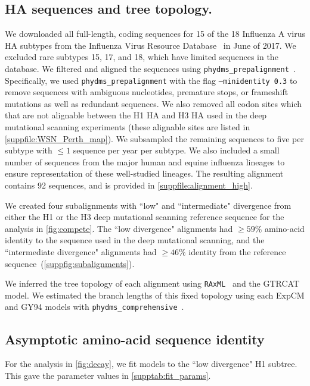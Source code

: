 \documentclass[11pt]{article}
\begin{document}
\subsection*{HA sequences and tree topology.}

We downloaded all full-length, coding sequences for 15 of the 18 Influenza A virus HA subtypes from the Influenza Virus Resource Database~\citep{bao2008influenza} in June of 2017. 
We excluded rare subtypes 15, 17, and 18, which have limited sequences in the database.  
We filtered and aligned the sequences using \texttt{phydms\_prepalignment}~\citep{hilton2017phydms}. 
Specifically, we used \texttt{phydms\_prepalignment} with the flag \texttt{--minidentity 0.3} to remove sequences with ambiguous nucleotides, premature stops, or frameshift mutations as well as redundant sequences.  
We also removed all codon sites which that are not alignable between the H1 HA and H3 HA used in the deep mutational scanning experiments (these alignable sites are listed in  \ref{suppfile:WSN_Perth_map}). 
We subsampled the remaining sequences to five per subtype with $\le 1$ sequence per year per subtype. 
We also included a small number of sequences from the major human and equine influenza lineages to ensure representation of these well-studied lineages. 
The resulting alignment contains 92 sequences, and is provided in \ref{suppfile:alignment_high}. 

We created four subalignments with ``low" and ``intermediate" divergence from either the H1 or the H3 deep mutational scanning reference sequence for the analysis in \ref{fig:compete}. 
The ``low divergence" alignments had $\ge 59\%$ amino-acid identity to the sequence used in the deep mutational scanning, and the ``intermediate divergence" alignments had $\ge 46\%$ identity from the reference sequence~(\ref{suppfig:subalignments}).

We inferred the tree topology of each alignment using \texttt{RAxML}~\citep{stamatakis2006raxml} and the GTRCAT model. 
We estimated the branch lengths of this fixed topology using each ExpCM and GY94 models with \texttt{phydms\_comprehensive}~\citep{hilton2017phydms}. 

\subsection*{Asymptotic amino-acid sequence identity}
For the analysis in \ref{fig:decay}, we fit models to the ``low divergence" H1 subtree.
This gave the parameter values in \ref{supptab:fit_params}. 
\end{document}
